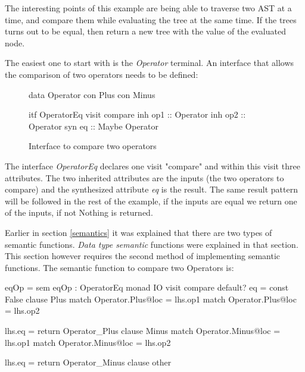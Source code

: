 The interesting points of this example are being able to traverse two AST at a time, and compare them while evaluating the tree at the same time.
If the trees turns out to be equal, then return a new tree with the value of the evaluated node.

The easiest one to start with is the \emph{Operator} terminal. An interface that allows the comparison of two operators needs to be defined:

\begin{figure}[H]
\begin{minipage}[t]{0.3\linewidth}
\begin{code}
data Operator
  con Plus
  con Minus
\end{code}
\end{minipage}
\begin{minipage}[t]{0.7\linewidth}
\begin{code}
itf OperatorEq
  visit compare
    inh op1  :: Operator
    inh op2  :: Operator
    syn eq   :: Maybe Operator
\end{code}
\end{minipage}
\caption{Interface to compare two operators}
\end{figure}

The interface \emph{OperatorEq} declares one visit "compare" and within this visit three attributes. The two inherited attributes are the inputs (the two operators to compare) and the synthesized attribute \emph{eq} is the result. The same result pattern will be followed in the rest of the example, if the inputs are equal we return one of the inputs, if not Nothing is returned.

Earlier in section \ref{semantics} it was explained that there are two types of semantic functions. \emph{Data type semantic} functions were explained in that section. This section however requires the second method of implementing semantic functions. The semantic function to compare two Operators is:

\begin{code}
{
eqOp = sem eqOp : OperatorEq monad IO
         visit compare
           default? eq = const False
           clause Plus
             match Operator.Plus@loc = lhs.op1
             match Operator.Plus@loc = lhs.op2
             
             lhs.eq = return Operator_Plus
           clause Minus
             match Operator.Minus@loc = lhs.op1
             match Operator.Minus@loc = lhs.op2

             lhs.eq = return Operator_Minus
           clause other
}
\end{code}

